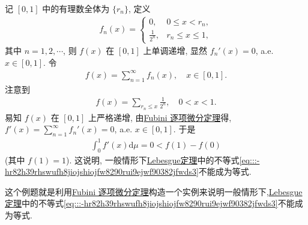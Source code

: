 \documentclass[../../main.tex]{subfiles}%
\begin{document}
\begin{example}
记 $[0,1]$ 中的有理数全体为 $\{r_n\}$, 定义
\begin{align*}
f_n(x) =
\begin{cases}
0, & 0\leqslant x < r_n, \\
\frac{1}{2^n}, & r_n\leqslant x\leqslant 1,
\end{cases}
\end{align*}
其中 $n=1,2,\cdots$, 则 $f(x)$ 在 $[0,1]$ 上单调递增, 显然 $f_n'(x)=0$, a.e. $x\in[0,1]$. 令
\begin{align*}
f(x) = \sum_{n=1}^\infty f_n(x),\quad x\in[0,1].
\end{align*}
注意到
\begin{align*}
f(x) = \sum_{r_n\leqslant x} \frac{1}{2^n},\quad 0<x<1.
\end{align*}
易知 $f(x)$ 在 $[0,1]$ 上严格递增, 由\hyperref[theorem:实变函数--Fubini 逐项微分定理]{Fubini 逐项微分定理}得, $f'(x)=\sum_{n=1}^\infty f_n'(x)=0$, a.e. $x\in[0,1]$. 于是
\begin{align*}
\int_0^1 f'(x)\mathrm{d}\mu = 0 < f(1)-f(0)
\end{align*}
(其中 $f(1)=1$). 这说明, 一般情形下\hyperref[theorem:Lebesgue定理--实变函数]{Lebesgue定理}中的不等式\eqref{eq:::-hr82h39rhswufh8jiojshiojfw8290rui9ejwf90382jfwds3}不能成为等式.
\end{example}
\begin{remark}
这个例题就是利用\hyperref[theorem:实变函数--Fubini 逐项微分定理]{Fubini 逐项微分定理}构造一个实例来说明一般情形下,\hyperref[theorem:Lebesgue定理--实变函数]{Lebesgue定理}中的不等式\eqref{eq:::-hr82h39rhswufh8jiojshiojfw8290rui9ejwf90382jfwds3}不能成为等式.
\end{remark}
\end{document}
